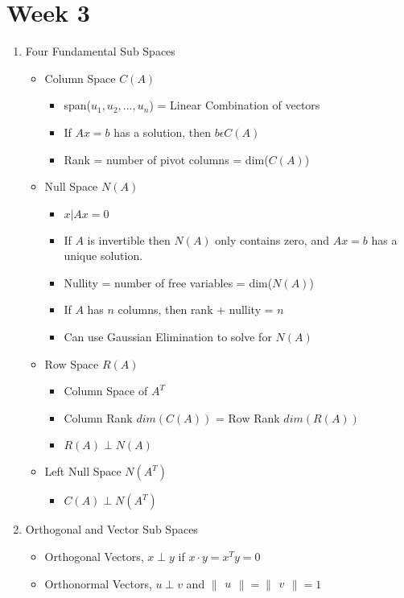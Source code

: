 \documentclass[a4paper]{article}
\begin{document}
\section{Week 3}
	\begin{enumerate}
		\item Four Fundamental Sub Spaces
		\begin{itemize}
			\item Column Space $C(A)$
			\begin{itemize}
				\item span($u_{1}, u_{2},...,u_{n}$) = Linear Combination of vectors
				\item If $Ax = b$ has a solution, then $b\epsilon C(A)$
				\item Rank = number of pivot columns = dim($C(A)$)
			\end{itemize}
			\item Null Space $N(A)$
			\begin{itemize}
				\item ${x| Ax = 0}$
				\item If $A$ is invertible then $N(A)$ only contains zero, and $Ax = b$ has a unique solution.
				\item Nullity = number of free variables = dim($N(A)$)
				\item If $A$ has $n$ columns, then rank + nullity = $n$
				\item Can use Gaussian Elimination to solve for $N(A)$
			\end{itemize}
			\item Row Space $R(A)$
			\begin{itemize}
				\item Column Space of $A^{T}$
				\item Column Rank $dim(C(A))$ = Row Rank $dim(R(A))$
				\item $R(A) \perp N(A)$
			\end{itemize}
			\item Left Null Space $N(A^{T})$
			\begin{itemize}
				\item $C(A) \perp N(A^{T})$
			\end{itemize}
		\end{itemize}
		\item Orthogonal and Vector Sub Spaces
		\begin{itemize}
			\item Orthogonal Vectors, $x \perp y$ if $x\cdot y = x^{T}y = 0$
			\item Orthonormal Vectors, $u \perp v$ and $\begin{Vmatrix} u\end{Vmatrix} =\begin{Vmatrix} v\end{Vmatrix} = 1$

\end{itemize}
\end{enumerate}
\end{document}
